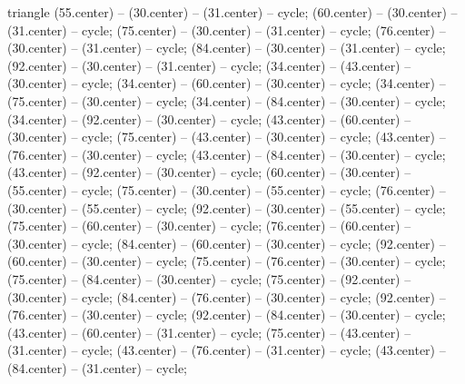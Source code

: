 \begin{pgfonlayer}{triangle}
 (55.center) -- (30.center) -- (31.center) -- cycle; 
 (60.center) -- (30.center) -- (31.center) -- cycle; 
 (75.center) -- (30.center) -- (31.center) -- cycle; 
 (76.center) -- (30.center) -- (31.center) -- cycle; 
 (84.center) -- (30.center) -- (31.center) -- cycle; 
 (92.center) -- (30.center) -- (31.center) -- cycle; 
 (34.center) -- (43.center) -- (30.center) -- cycle; 
 (34.center) -- (60.center) -- (30.center) -- cycle; 
 (34.center) -- (75.center) -- (30.center) -- cycle; 
 (34.center) -- (84.center) -- (30.center) -- cycle; 
 (34.center) -- (92.center) -- (30.center) -- cycle; 
 (43.center) -- (60.center) -- (30.center) -- cycle; 
 (75.center) -- (43.center) -- (30.center) -- cycle; 
 (43.center) -- (76.center) -- (30.center) -- cycle; 
 (43.center) -- (84.center) -- (30.center) -- cycle; 
 (43.center) -- (92.center) -- (30.center) -- cycle; 
 (60.center) -- (30.center) -- (55.center) -- cycle; 
 (75.center) -- (30.center) -- (55.center) -- cycle; 
 (76.center) -- (30.center) -- (55.center) -- cycle; 
 (92.center) -- (30.center) -- (55.center) -- cycle; 
 (75.center) -- (60.center) -- (30.center) -- cycle; 
 (76.center) -- (60.center) -- (30.center) -- cycle; 
 (84.center) -- (60.center) -- (30.center) -- cycle; 
 (92.center) -- (60.center) -- (30.center) -- cycle; 
 (75.center) -- (76.center) -- (30.center) -- cycle; 
 (75.center) -- (84.center) -- (30.center) -- cycle; 
 (75.center) -- (92.center) -- (30.center) -- cycle; 
 (84.center) -- (76.center) -- (30.center) -- cycle; 
 (92.center) -- (76.center) -- (30.center) -- cycle; 
 (92.center) -- (84.center) -- (30.center) -- cycle; 
 (43.center) -- (60.center) -- (31.center) -- cycle; 
 (75.center) -- (43.center) -- (31.center) -- cycle; 
 (43.center) -- (76.center) -- (31.center) -- cycle; 
 (43.center) -- (84.center) -- (31.center) -- cycle; 

\end{pgfonlayer}

